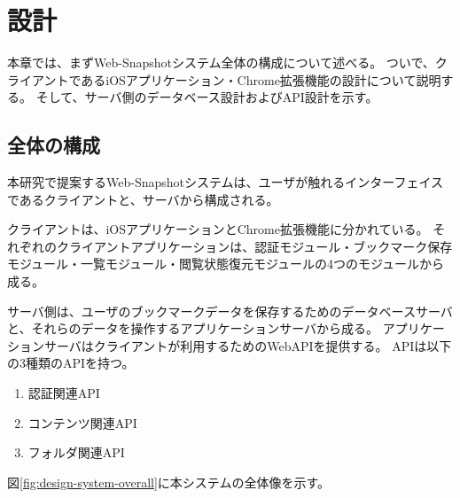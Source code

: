 \chapter{設計}
\label{chap:design}
本章では、まずWeb-Snapshotシステム全体の構成について述べる。
ついで、クライアントであるiOSアプリケーション・Chrome拡張機能の設計について説明する。
そして、サーバ側のデータベース設計およびAPI設計を示す。

\section{全体の構成}
本研究で提案するWeb-Snapshotシステムは、ユーザが触れるインターフェイスであるクライアントと、サーバから構成される。

クライアントは、iOSアプリケーションとChrome拡張機能に分かれている。
それぞれのクライアントアプリケーションは、認証モジュール・ブックマーク保存モジュール・一覧モジュール・閲覧状態復元モジュールの4つのモジュールから成る。

サーバ側は、ユーザのブックマークデータを保存するためのデータベースサーバと、それらのデータを操作するアプリケーションサーバから成る。
アプリケーションサーバはクライアントが利用するためのWebAPIを提供する。
APIは以下の3種類のAPIを持つ。
\begin{enumerate}
   \item 認証関連API
   \item コンテンツ関連API
   \item フォルダ関連API
\end{enumerate}

図\ref{fig:design-system-overall}に本システムの全体像を示す。

